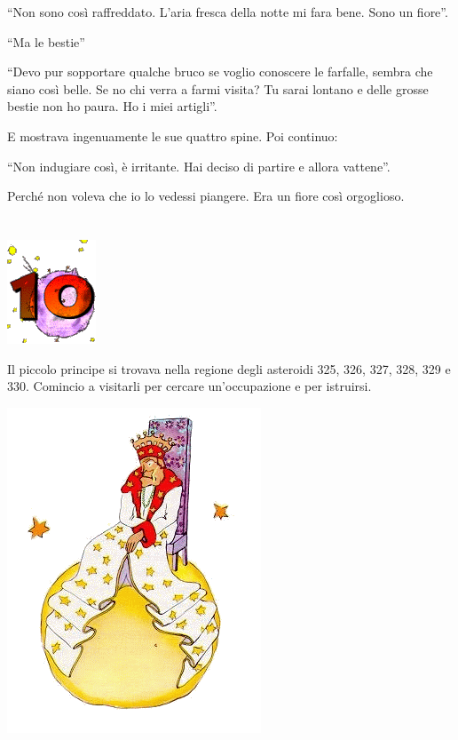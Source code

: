 \documentclass[11pt]{scrbook}
\begin{document}
``Non sono così raffreddato. L'aria fresca della notte mi fara bene.
Sono un fiore''.

``Ma le bestie''

``Devo pur sopportare qualche bruco se voglio conoscere le farfalle,
sembra che siano così belle. Se no chi verra a farmi visita? Tu sarai
lontano e delle grosse bestie non ho paura. Ho i miei artigli''.

E mostrava ingenuamente le sue quattro spine. Poi continuo:

``Non indugiare così, è irritante. Hai deciso di partire e allora
vattene''.

Perché non voleva che io lo vedessi piangere. Era un fiore così
orgoglioso.

\chapter{}
\begin{center}
\includegraphics{img/chapter10}
\end{center}

Il piccolo principe si trovava nella regione degli asteroidi 325, 326,
327, 328, 329 e 330. Comincio a visitarli per cercare un'occupazione e
per istruirsi.

\begin{center}
\includegraphics{img/10a}
\end{center}
\end{document}
